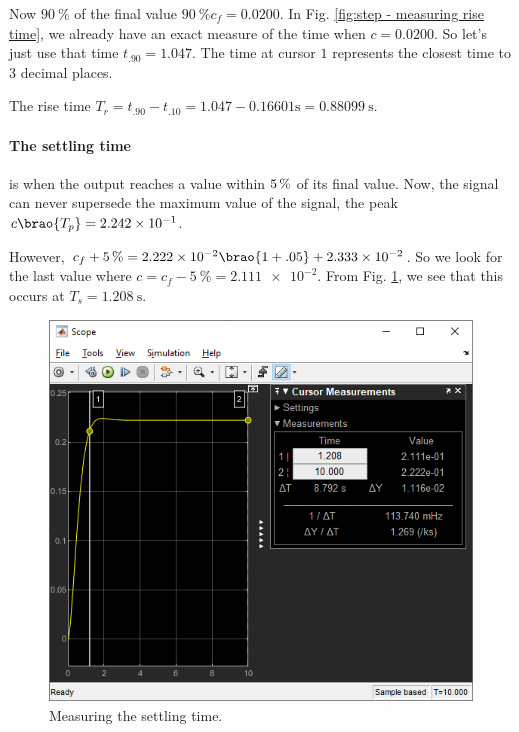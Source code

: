 \documentclass[12pt]{article}
\newcommand*\siexpr[2][]{\SI[parse-numbers=false,#1]{#2}}%
\DeclarePairedDelimiter\brao()%
\begin{document}
Now $\SI{90}\percent$ of the final value $\SI{90}\percent c_f = 0.0200$.
In Fig. \ref{fig:step - measuring rise time}, we already have an exact measure of the time when $c = 0.0200$.
So let's just use that time $t_{.90} = 1.047$.
The time at cursor $1$ represents the closest time to $3$ decimal places.

The rise time $T_r = t_{.90} - t_{.10} = 1.047 - 0.16601 \si\second = \siexpr{0.88099}\second$.

\paragraph{The settling time} is when the output reaches a value within $\SI5\percent$ of its final value.
Now, the signal can never supersede the maximum value of the signal, the peak $c\brao{T_p} = \num{2.242e-1}$.

However, $c_f + \SI{5}\percent = \num{2.222e-2}\brao{1 + .05} + \num{2.333e-2}$.
So we look for the last value where $c = c_f - \SI{5}\percent = \num{2.111e-2}$.
From Fig. \ref{fig:step - measuring setting time}, we see that this occurs at $T_s = \SI{1.208}\second$.

\begin{figure}[h]
    \centering
    \includegraphics[width=\linewidth]{part01a_measuring_settling_time.png}
    \caption{Measuring the settling time.}
    \label{fig:step - measuring setting time}
\end{figure}
\end{document}
